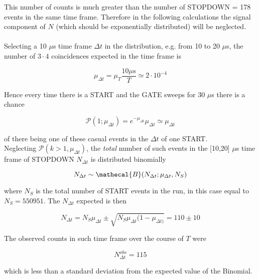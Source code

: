 \documentclass[10pt,a4paper,twocolumn]{article}
\begin{document}
\begin{appendices}
This number of counts is much greater than the number of STOPDOWN = 178 events in the same time frame. Therefore in the following calculations the signal component of $N$ (which should be exponentially distributed) will be neglected.
\\
\\
Selecting a 10 $\mu$s time frame $\Delta t$ in the distribution, e.g. from 10 to 20 $\mu$s, the number of $3\cdot 4$ coincidences expected in the time frame is 

\begin{equation}
    \mu_{\Delta t}=\mu_T\frac{10\mu\text{s}}{T}\simeq 2 \cdot 10^{-4}
\end{equation}

Hence every time there is a START and the GATE sweeps for 30 $\mu$s there is a chance

\begin{equation}
    \mathcal{P}(1;\mu_{\Delta t})=e^{-\mu_{\Delta t}}\mu_{\Delta t}\simeq \mu_{\Delta t}
\end{equation}

of there being one of these casual events in the $\Delta t$ of one START. 
\\
Neglecting $\mathcal{P}(k>1,\mu_{\Delta t})$, the \textit{total} number of such events in the [10,20] $\mu$s time frame of STOPDOWN  $N_{\Delta t}$ is distributed binomially

\begin{equation}
    N_{\Delta t}\sim \mathecal{B}(N_{\Delta t};\mu_{\Delta t},N_S)
\end{equation}

where $N_S$ is the total number of START events in the run, in this case equal to $N_S= 550951$. The $N_{\Delta t}$ expected is then 

\begin{equation}
    N_{\Delta t}= N_S \mu_{\Delta t}\pm \sqrt{N_S \mu_{\Delta t}(1-\mu_{\Delta t)}}=110 \pm 10
\end{equation}

The observed counts in such time frame over the course of $T$ were

\begin{equation}
    N^{obs}_{\Delta t}=115
\end{equation}

which is less than a standard deviation from the expected value of the Binomial.



\end{appendices}
\end{document}
